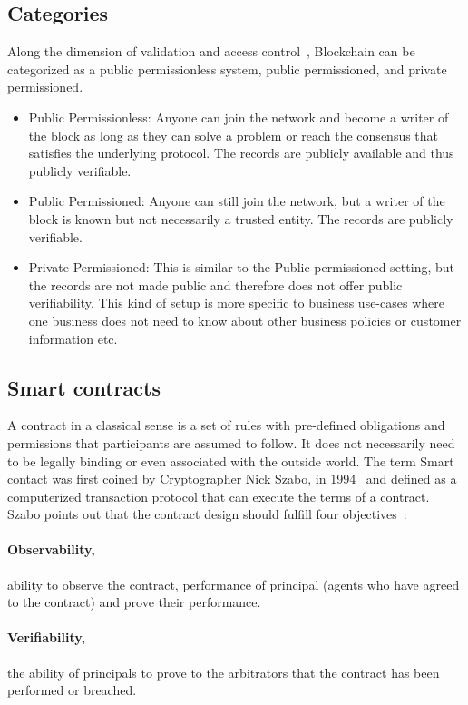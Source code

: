 \subsection{Categories}
Along the dimension of validation and access control~\cite{voronchenko2017you},
Blockchain can be categorized as a public permissionless system, public
permissioned, and private permissioned. 
\begin{itemize}
	\item Public Permissionless: Anyone can join the network and become a writer
		of the block as long as they can solve a problem or reach the consensus
		that satisfies the underlying protocol. The records are publicly
		available and thus publicly verifiable. 
	\item Public Permissioned: Anyone can still join the network, but a writer
		of the block is known but not necessarily a trusted entity. The records
		are publicly verifiable. 
	\item Private Permissioned: This is similar to the Public permissioned
		setting, but the records are not made public and therefore does not
		offer public verifiability. This kind of setup is more specific to
		business use-cases where one business does not need to know about other
		business policies or customer information etc. 
\end{itemize}
\subsection{Smart contracts}
A contract in a classical sense is a set of rules with pre-defined obligations
and permissions that participants are assumed to follow. It does not
necessarily need to be legally binding or even associated with the outside
world. The term Smart contact was first coined by Cryptographer Nick Szabo, in
1994~\cite{SzaboSmart1994} and defined as a computerized transaction protocol
that can execute the terms of a contract. Szabo points out that the contract
design should fulfill four objectives~\cite{szabo1996smart}: 
\paragraph{Observability,}ability to observe the contract, performance of
principal (agents who have agreed to the contract) and prove their
performance.
\paragraph{Verifiability,}the ability of principals to prove to the arbitrators
that the contract has been performed or breached.  
